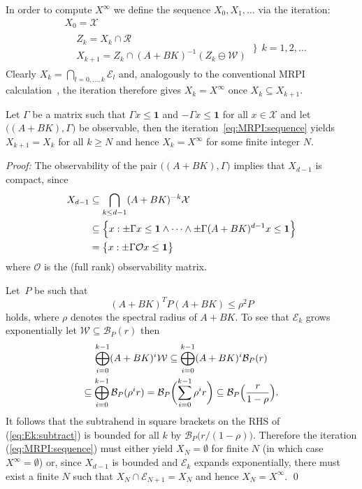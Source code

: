 \documentclass{ifacconf}
\def\bpf{\textnormal{\textit{Proof:}\hspace{1ex}}}
\def\epf{\hfill \mbox{\qed}}%
\newcommand{\Obs}{\mathcal{O}}
\providecommand{\B}{\mathcal B}
\providecommand{\E}{\mathcal E}
\providecommand{\W}{\mathcal W}
\providecommand{\X}{\mathcal X}
\providecommand{\R}{\mathcal R}
\providecommand{\bfa}[1]{\mathbf{#1}}
\begin{document}
%
In order to compute $X^\infty$ we define the sequence $X_0,X_1,\ldots$ via the iteration:
%
\begin{equation}\label{eq:MRPI:sequence}
\begin{aligned}
  & X_0 = \X \\
  & \begin{aligned}
      & Z_k = X_k\cap\R\\
      & X_{k+1} = Z_k\cap(A+BK)^{-1}(Z_k\ominus\W)
    \end{aligned} 
  \ \Biggr\} \ \ k = 1,2,\ldots
\end{aligned}
\end{equation}
%
Clearly $X_k = \bigcap_{l=0,\ldots,k}\E_l$ and, analogously to the conventional MRPI calculation~\citep{Kolmanovsky:1998}, the iteration therefore gives $X_k = X^\infty$ once $X_k\subseteq X_{k+1}$.

\vspace{0.5\baselineskip}
\begin{thm}\label{thm2}
Let $\Gamma$ be a matrix such that $\Gamma x\leq\bfa{1}$ and $-\Gamma x\leq\bfa{1}$ for all $x\in\X$ and let $\bigl((A+BK),\Gamma\bigr)$ be observable, then the iteration~\eqref{eq:MRPI:sequence} %
yields $X_{k+1}=X_k$ for all $k\geq N$ and hence $X_k=X^\infty$ for some finite integer $N$.
\end{thm}
%
\bpf
%
The observability of the pair $\bigl((A+BK),\Gamma\bigr)$ implies that $X_{d-1}$ is compact, since 
\begin{align*}
X_{d-1} 
&\subseteq\bigcap_{k\leq d-1}(A+BK)^{-k}\X\\
&\subseteq \Bigl\{x:\pm\Gamma x\leq\bfa{1}\wedge\dots\wedge\pm\Gamma(A+BK)^{d-1} x\leq\bfa{1} \Bigr\}\\
& = \bigl\{x:\pm\Gamma \Obs x\leq \bfa{1}\bigr\}
\end{align*}
where $\Obs$ is the (full rank) observability matrix.

Let~$P$ be such that 
\[
(A+BK)^TP(A+BK) \leq \rho^2P
\]
holds, where $\rho$ denotes the spectral radius of $A+BK$.
%
To see that $\E_k$ grows exponentially let $\W\subseteq\B_P(r)$ then
%
\begin{multline*}
  \bigoplus_{i=0}^{k-1}(A+BK)^i\W \subseteq \bigoplus_{i=0}^{k-1}(A+BK)^i\B_P(r)\\
  \subseteq\bigoplus_{i=0}^{k-1}\B_P(\rho^i r) = \B_P\biggl(\sum_{i=0}^{k-1}\rho^i r\biggr)\subseteq\B_P\Bigl(\frac{r}{1-\rho}\Bigr) .
\end{multline*}
%
It follows that the subtrahend in square brackets on the RHS of (\ref{eq:Ek:subtract}) is bounded for all $k$ by $\B_P\bigl(r / (1-\rho)\bigr)$.
%
Therefore 
the iteration (\ref{eq:MRPI:sequence}) must either yield $X_N = \emptyset$ for finite $N$
(in which case $X^\infty=\emptyset$) or,
since $X_{d-1}$ is bounded and $\E_k$ expands exponentially, there must exist a finite $N$ such that $X_{N}\cap\E_{N+1}=X_N$ and hence $X_N=X^\infty$.
%
\epf
\end{document}
